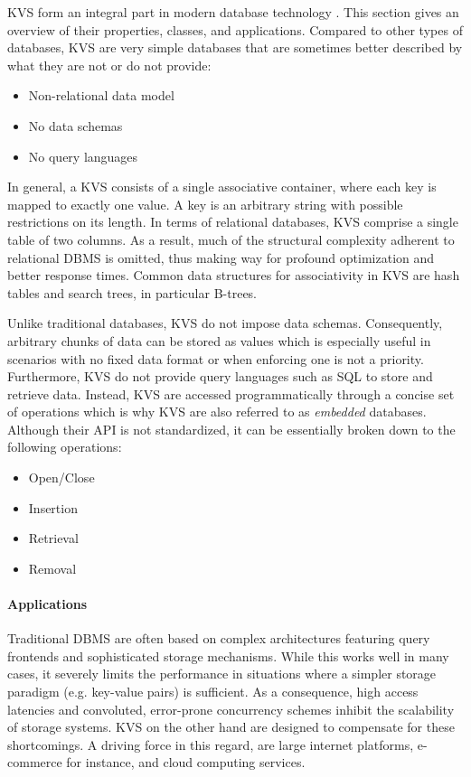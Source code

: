 \ac{KVS} form an integral part in modern database technology
\cite{fiebig2016one}. This section gives an overview of their properties,
classes, and applications. Compared to other types of databases, \ac{KVS} are
very simple databases that are sometimes better described by what they are not
or do not provide:

\begin{itemize}
    \item Non-relational data model
    \item No data schemas
    \item No query languages
\end{itemize}

In general, a \ac{KVS} consists of a single associative container, where each
key is mapped to exactly one value. A key is an arbitrary string with possible
restrictions on its length. In terms of relational databases, \ac{KVS} comprise
a single table of two columns. As a result, much of the structural complexity
adherent to relational \ac{DBMS} is omitted, thus making way for profound
optimization and better response times. Common data structures for associativity
in \ac{KVS} are hash tables and search trees, in particular B-trees.

Unlike traditional databases, \ac{KVS} do not impose data schemas. Consequently,
arbitrary chunks of data can be stored as values which is especially useful in
scenarios with no fixed data format or when enforcing one is not a priority.
Furthermore, \ac{KVS} do not provide query languages such as SQL to store and
retrieve data. Instead, \ac{KVS} are accessed programmatically through a concise
set of operations which is why \ac{KVS} are also referred to as \emph{embedded}
databases. Although their \ac{API} is not standardized, it can be essentially
broken down to the following operations:

\begin{itemize}
    \item Open/Close
    \item Insertion
    \item Retrieval
    \item Removal
\end{itemize}

\paragraph{Applications}

Traditional \ac{DBMS} are often based on complex architectures featuring query
frontends and sophisticated storage mechanisms. While this works well in many
cases, it severely limits the performance in situations where a simpler storage
paradigm (e.g. key-value pairs) is sufficient. As a consequence, high access
latencies and convoluted, error-prone concurrency schemes inhibit the
scalability of storage systems. \ac{KVS} on the other hand are designed to
compensate for these shortcomings. A driving force in this regard, are large
internet platforms, e-commerce for instance, and cloud computing services.

